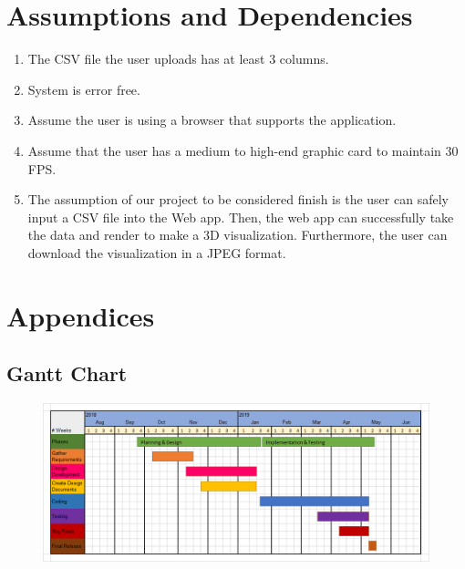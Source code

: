\documentclass[journal,10pt,onecolumn,compsoc]{IEEEtran} \usepackage[margin=1.0in]{geometry} \usepackage{pdfpages}
\begin{document}
\section{Assumptions and Dependencies}
\begin{enumerate}
    \item The CSV file the user uploads has at least 3 columns.
    \item System is error free.
    \item Assume the user is using a browser that supports the application.
    \item Assume that the user has a medium to high-end graphic card to maintain 30 FPS.
    \item The assumption of our project to be considered finish is the user can safely input a CSV file into the Web app. Then, the web app can successfully take the data and render to make a 3D visualization. Furthermore, the user can download the visualization in a JPEG format.
\end{enumerate}
    
\section{Appendices}
    \subsection{Gantt Chart}
     \begin{figure}[H]
         \centering
                \includegraphics[width=\linewidth]{./gantt.png}
     \end{figure}
     
\end{document}
